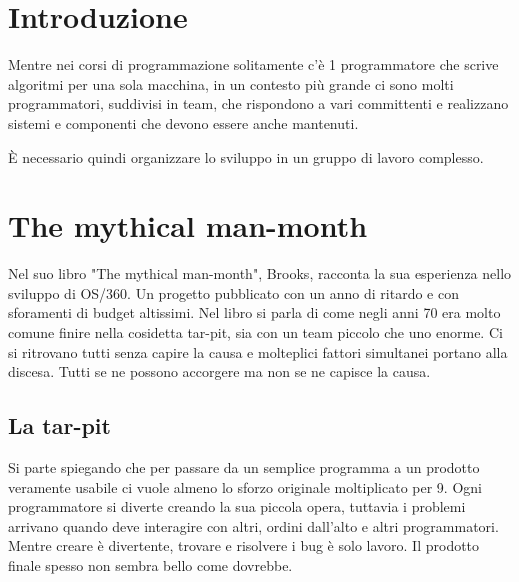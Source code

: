 \documentclass[a4paper,12pt,titlepage,oneside]{book}
\begin{document}
\chapter{Introduzione}
Mentre nei corsi di programmazione solitamente c'è 1 programmatore che scrive algoritmi per una sola macchina, in un contesto più grande ci sono molti programmatori, suddivisi in team, che rispondono a vari committenti e realizzano sistemi e componenti che devono essere anche mantenuti.

È necessario quindi organizzare lo sviluppo in un gruppo di lavoro complesso.

\chapter{The mythical man-month}
Nel suo libro "The mythical man-month", Brooks, racconta la sua esperienza nello sviluppo di OS/360. Un progetto pubblicato con un anno di ritardo e con sforamenti di budget altissimi.
Nel libro si parla di come negli anni 70 era molto comune finire nella cosidetta tar-pit, sia con un team piccolo che uno enorme. Ci si ritrovano tutti senza capire la causa e molteplici fattori simultanei portano alla discesa. Tutti se ne possono accorgere ma non se ne capisce la causa.

\section{La tar-pit}
Si parte spiegando che per passare da un semplice programma a un prodotto veramente usabile ci vuole almeno lo sforzo originale moltiplicato per 9.
Ogni programmatore si diverte creando la sua piccola opera, tuttavia i problemi arrivano quando deve interagire con altri, ordini dall'alto e altri programmatori. Mentre creare è divertente, trovare e risolvere i bug è solo lavoro. Il prodotto finale spesso non sembra bello come dovrebbe.
\end{document}
